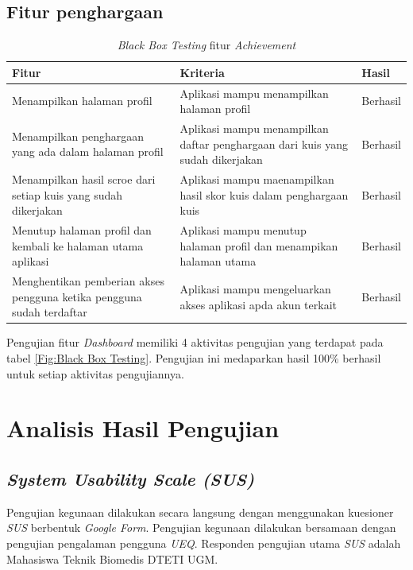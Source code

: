 \subsection{Fitur penghargaan}
\begin{table}[H]
	\caption{\textit{Black Box Testing} fitur \textit{Achievement}}
	\label{Tab:blackBoxAchie}
	\begin{tabular}{|p{}|p{}|p{}|}
		\hline
		 \centering\textbf{Fitur} & \multicolumn{1}{m{0.45\textwidth}|}{\centering \textbf{Kriteria}}&  \multicolumn{1}{m{0.1\textwidth}|}{\centering \textbf{Hasil}}\\
		\hline
		Menampilkan halaman profil
		& Aplikasi mampu menampilkan halaman profil 
		& Berhasil\\
		\hline
		Menampilkan penghargaan yang ada dalam halaman profil
		& Aplikasi mampu menampilkan daftar penghargaan dari kuis yang sudah dikerjakan
		& Berhasil\\
		\hline
		Menampilkan hasil scroe dari setiap kuis yang sudah dikerjakan
		& Aplikasi mampu maenampilkan hasil skor kuis dalam penghargaan kuis
		& Berhasil\\
		\hline
		Menutup halaman profil dan kembali ke halaman utama aplikasi
		&Aplikasi mampu menutup halaman profil dan menampikan halaman utama
		& Berhasil\\
		\hline
		Menghentikan pemberian akses pengguna ketika pengguna sudah terdaftar
		& Aplikasi mampu mengeluarkan akses aplikasi apda akun terkait
		& Berhasil\\
		\hline
	\end{tabular}
\end{table}
Pengujian fitur \textit{Dashboard} memiliki 4 aktivitas pengujian yang terdapat pada tabel \ref*{Fig:Black Box Testing}.
Pengujian ini medaparkan hasil 100\% berhasil untuk setiap aktivitas pengujiannya.
\newpage
\section{Analisis Hasil Pengujian}
\subsection{\textit{System Usability Scale (SUS)}}
Pengujian kegunaan dilakukan secara langsung dengan menggunakan kuesioner \textit{SUS} berbentuk \textit{Google Form}.
Pengujian kegunaan dilakukan bersamaan dengan pengujian pengalaman pengguna \textit{UEQ}.
Responden pengujian utama \textit{SUS} adalah Mahasiswa Teknik Biomedis DTETI UGM. 

